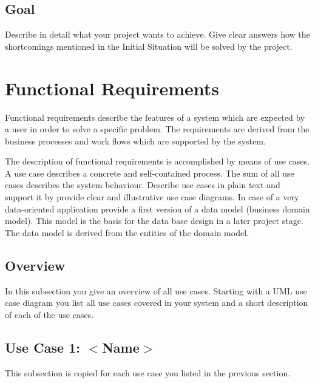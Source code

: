 \documentclass[12pt]{article}
\theoremstyle{definition}
\newenvironment{explanation}{%
   \setlength{\parindent}{0pt}
   \itshape
   \color{blue}
}{}
\begin{document}
\subsection{Goal}
\begin{explanation}
Describe in detail what your project wants to achieve. Give clear answers how the shortcomings mentioned in the Initial Situation will be solved by the project.
\end{explanation}
\pagebreak

\section{Functional Requirements}
\begin{explanation}
Functional requirements describe the features of a system which are expected by a user in order to solve a specific problem. The requirements are derived from the business processes and work flows which are supported by the system.

The description of functional requirements is accomplished by means of use cases. A use case describes a concrete and self-contained process. The sum of all use cases describes the system behaviour. Describe use cases in plain text and support it by provide clear and illustrative use case diagrams.
In case of a very data-oriented application provide a first version of a data model (business domain model). This model is the basis for the data base design in a later project stage. The data model is derived from the entities of the domain model.
\end{explanation}

\subsection{Overview}
\begin{explanation}
In this subsection you give an overview of all use cases. Starting with a UML use case diagram you list all use cases covered in your system and a short description of each of the use cases.
\end{explanation}

\subsection{Use Case 1: $<$Name$>$}
\begin{explanation}
This subsection is copied for each use case you listed in the previous section.
\end{explanation}
\end{document}
